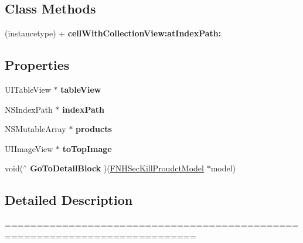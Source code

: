 \subsection*{Class Methods}
\begin{DoxyCompactItemize}
\item 
\mbox{\label{interface_f_n_home_sec_kill_view_cell_a1e5a43a81e1dddb2c8344a04daf35a6a}} 
(instancetype) + {\bfseries cell\+With\+Collection\+View\+:at\+Index\+Path\+:}
\end{DoxyCompactItemize}
\subsection*{Properties}
\begin{DoxyCompactItemize}
\item 
\mbox{\label{interface_f_n_home_sec_kill_view_cell_a649dc351a5ce21f34c1da966813e5c06}} 
U\+I\+Table\+View $\ast$ {\bfseries table\+View}
\item 
\mbox{\label{interface_f_n_home_sec_kill_view_cell_ac1affbbb83af1c3878e4610b1dd38fa1}} 
N\+S\+Index\+Path $\ast$ {\bfseries index\+Path}
\item 
\mbox{\label{interface_f_n_home_sec_kill_view_cell_a1aef92d83827a2e240f7f33ae2b49d87}} 
N\+S\+Mutable\+Array $\ast$ {\bfseries products}
\item 
\mbox{\label{interface_f_n_home_sec_kill_view_cell_a552d50dea425ba1462b4629961d7584b}} 
U\+I\+Image\+View $\ast$ {\bfseries to\+Top\+Image}
\item 
\mbox{\label{interface_f_n_home_sec_kill_view_cell_a183f7fc095aa0d4c45c288b4d6cd8f53}} 
void($^\wedge$ {\bfseries Go\+To\+Detail\+Block} )(\mbox{\hyperlink{interface_f_n_h_sec_kill_proudct_model}{F\+N\+H\+Sec\+Kill\+Proudct\+Model}} $\ast$model)
\end{DoxyCompactItemize}


\subsection{Detailed Description}
============================================================================

